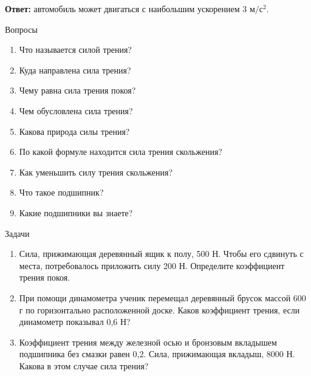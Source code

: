 \documentclass[a6paper, 11pt]{diss_4}
\renewcommand{\'}{\,'}
\begin{document}
\textbf{Ответ:} автомобиль может двигаться с наибольшим ускорением 3 $м/с^2$.

\begin{center}
   Вопросы
\end{center}
\begin{enumerate}
\item Что называется силой трения?
\item Куда направлена сила трения?
\item Чему равна сила трения покоя?
\item Чем обусловлена сила трения?
\item Какова природа силы трения?
\item По какой формуле находится сила трения скольжения?
\item Как уменьшить силу трения скольжения?
\item Что такое подшипник?
\item Какие подшипники вы знаете?
\end{enumerate}

\begin{center}
   Задачи
\end{center}
\begin{enumerate}

\item Сила, прижимающая деревянный ящик к полу, 500 Н. Чтобы его сдвинуть с места, потребовалось приложить силу 200 Н. Определите коэффициент трения покоя.

\item При помощи динамометра ученик перемещал деревянный брусок массой 600 г по горизонтально расположенной доске. Каков коэффициент трения, если динамометр показывал 0,6 Н?

\item Коэффициент трения между железной осью и бронзовым вкладышем подшипника без смазки равен 0,2. Сила, прижимающая вкладыш, 8000 Н. Какова в этом случае сила трения?

\end{enumerate}
\end{document}
